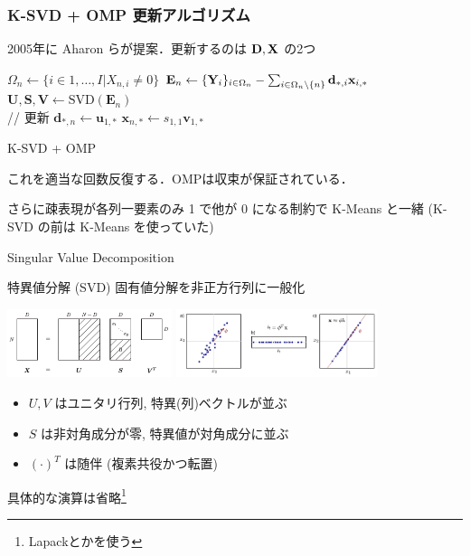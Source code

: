 \begin{frame}\frametitle{K-SVD + OMP 更新アルゴリズム}
2005年に Aharon らが提案\cite{Aharon2005}．更新するのは ${\mathbf{D}}, {\mathbf{X}}$ の2つ
\begin{algorithm}[H]
\begin{algorithmic}[1]
\STATE $\Omega_n \leftarrow \{ i \in {1, \dots, I} | X_{n, i} \neq 0 \}$
\STATE $\mathbf{E}_n \leftarrow \{{\mathbf{Y}}_i\}_{i \in \Omega_n} - \sum_{i \in \Omega_n \setminus \{n\}} \mathbf{d}_{*,i} \mathbf{x}_{i,*}$
\STATE $\mathbf{U, S, V} \leftarrow \mathrm{SVD}(\mathbf{E}_n)$ \\
// 更新
\STATE $\mathbf{d}_{*,n} \leftarrow \mathbf{u}_{1,*}$
\STATE $\mathbf{x}_{n,*} \leftarrow s_{1,1} \mathbf{v}_{1,*}$
\ENDFOR
\end{algorithmic}
\caption{K-SVD + OMP}
\label{alg:seq}
\end{algorithm}
これを適当な回数反復する．OMPは収束が保証されている．

さらに疎表現が各列一要素のみ 1 で他が 0 になる制約で K-Means と一緒 (K-SVD の前は K-Means を使っていた)
\end{frame}


\begin{frame}{Singular Value Decomposition}
\begin{block}{特異値分解 (SVD)}
固有値分解を非正方行列に一般化

\includegraphics[height=2cm]{figure/svd.png}
\includegraphics[height=2cm]{figure/svd1.png}

\begin{itemize}
    \item $U, V$ はユニタリ行列, 特異(列)ベクトルが並ぶ
    \item $S$ は非対角成分が零, 特異値が対角成分に並ぶ
    \item $(\cdot)^T$ は随伴 (複素共役かつ転置)
\end{itemize}
\end{block}
具体的な演算は省略\footnote{Lapackとかを使う}
\end{frame}


